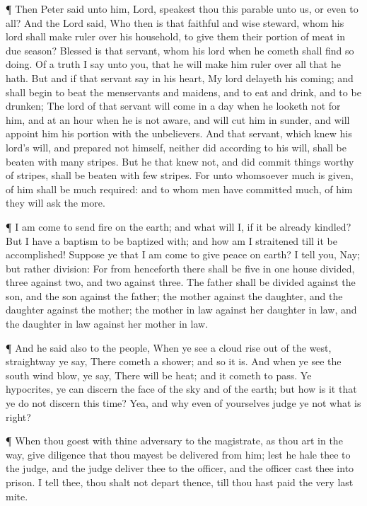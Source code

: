 ¶ Then Peter said unto him, Lord, speakest thou this
parable unto us, or even to all?  And the Lord said, Who
then is that faithful and wise steward, whom his lord shall make ruler
over his household, to give them their portion of meat in due season?
 Blessed is that servant, whom his lord when he cometh
shall find so doing.  Of a truth I say unto you, that he
will make him ruler over all that he hath.  But and if that
servant say in his heart, My lord delayeth his coming; and shall begin
to beat the menservants and maidens, and to eat and drink, and to be
drunken;  The lord of that servant will come in a day when
he looketh not for him, and at an hour when he is not aware, and will
cut him in sunder, and will appoint him his portion with the
unbelievers.  And that servant, which knew his lord's will,
and prepared not himself, neither did according to his will, shall be
beaten with many stripes.  But he that knew not, and did
commit things worthy of stripes, shall be beaten with few stripes. For
unto whomsoever much is given, of him shall be much required: and to
whom men have committed much, of him they will ask the more.

 ¶ I am come to send fire on the earth; and what will I, if
it be already kindled?  But I have a baptism to be baptized
with; and how am I straitened till it be accomplished! 
Suppose ye that I am come to give peace on earth? I tell you, Nay; but
rather division:  For from henceforth there shall be five
in one house divided, three against two, and two against three.
 The father shall be divided against the son, and the son
against the father; the mother against the daughter, and the daughter
against the mother; the mother in law against her daughter in law, and
the daughter in law against her mother in law.

 ¶ And he said also to the people, When ye see a cloud rise
out of the west, straightway ye say, There cometh a shower; and so it
is.  And when ye see the south wind blow, ye say, There
will be heat; and it cometh to pass.  Ye hypocrites, ye can
discern the face of the sky and of the earth; but how is it that ye do
not discern this time?  Yea, and why even of yourselves
judge ye not what is right?

 ¶ When thou goest with thine adversary to the magistrate,
as thou art in the way, give diligence that thou mayest be delivered
from him; lest he hale thee to the judge, and the judge deliver thee to
the officer, and the officer cast thee into prison.  I tell
thee, thou shalt not depart thence, till thou hast paid the very last
mite.

